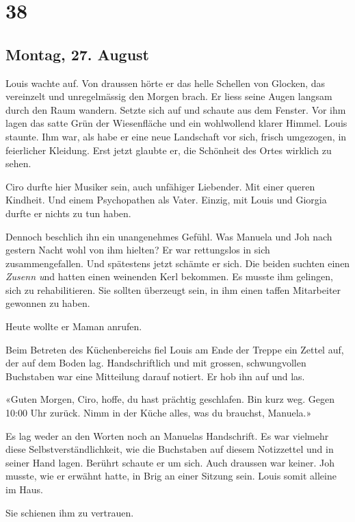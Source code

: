 \chapter{38}\label{section-37}

\section{Montag, 27. August}\label{montag-27.-august}

Louis wachte auf. Von draussen hörte er das helle Schellen von Glocken,
das vereinzelt und unregelmässig den Morgen brach. Er liess seine Augen
langsam durch den Raum wandern. Setzte sich auf und schaute aus dem
Fenster. Vor ihm lagen das satte Grün der Wiesenfläche und ein
wohlwollend klarer Himmel. Louis staunte. Ihm war, als habe er eine neue
Landschaft vor sich, frisch umgezogen, in feierlicher Kleidung. Erst
jetzt glaubte er, die Schönheit des Ortes wirklich zu sehen.

Ciro durfte hier Musiker sein, auch unfähiger Liebender. Mit einer
queren Kindheit. Und einem Psychopathen als Vater. Einzig, mit Louis und
Giorgia durfte er nichts zu tun haben.

Dennoch beschlich ihn ein unangenehmes Gefühl. Was Manuela und Joh nach
gestern Nacht wohl von ihm hielten? Er war rettungslos in sich
zusammengefallen. Und spätestens jetzt schämte er sich. Die beiden
suchten einen \emph{Zusenn u}nd hatten einen weinenden Kerl bekommen. Es
musste ihm gelingen, sich zu rehabilitieren. Sie sollten überzeugt sein,
in ihm einen taffen Mitarbeiter gewonnen zu haben.

Heute wollte er Maman anrufen.

Beim Betreten des Küchenbereichs fiel Louis am Ende der Treppe ein
Zettel auf, der auf dem Boden lag. Handschriftlich und mit grossen,
schwungvollen Buchstaben war eine Mitteilung darauf notiert. Er hob ihn
auf und las.

«Guten Morgen, Ciro, hoffe, du hast prächtig geschlafen. Bin kurz weg.
Gegen 10:00 Uhr zurück. Nimm in der Küche alles, was du brauchst,
Manuela.»

Es lag weder an den Worten noch an Manuelas Handschrift. Es war vielmehr
diese Selbstverständlichkeit, wie die Buchstaben auf diesem Notizzettel
und in seiner Hand lagen. Berührt schaute er um sich. Auch draussen war
keiner. Joh musste, wie er erwähnt hatte, in Brig an einer Sitzung sein.
Louis somit alleine im Haus.

Sie schienen ihm zu vertrauen.


